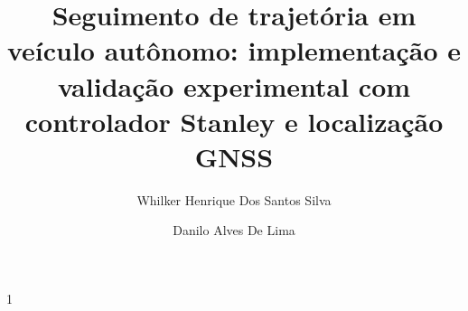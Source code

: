 \documentclass[a4paper]{ifacconf}
\def\portugues{1}
\def\portugues{0}
\begin{document}
	
	
\if\portugues1

% 
	
\begin{frontmatter}


\title{Seguimento de trajetória em veículo autônomo: implementação e validação experimental com controlador Stanley e localização GNSS} 



\author[First]{Whilker Henrique Dos Santos Silva} 
\author[Second]{Danilo Alves De Lima} 


\address[First]{Escola de Engenharia - Departamento de Automática, Universidade Federal de Lavras (e-mail: whilker.silva@estudante.ufla.br).}
\address[Second]{Escola de Engenharia - Departamento de Automática, Universidade Federal de Lavras (e-mail: danilo.delima@ufla.br)}




\end{frontmatter}
\end{document}
